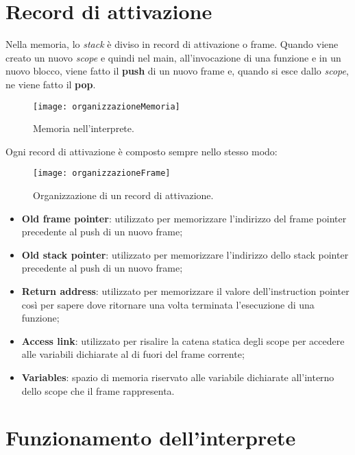 \documentclass[../report.tex]{subfiles}
\begin{document}
\section{Record di attivazione}\label{s:record-di-attivazione}
Nella memoria, lo \textit{stack} \`e diviso in record di attivazione o frame. Quando viene creato un nuovo \textit{scope} e quindi nel main, all'invocazione di una funzione e in un nuovo blocco, viene fatto il \textbf{push} di un nuovo frame e, quando si esce dallo \textit{scope}, ne viene fatto il \textbf{pop}.
\begin{figure}[H]
    \centering
    \texttt{[image: organizzazioneMemoria]}
    \caption{Memoria nell'interprete.}
\end{figure}
Ogni record di attivazione \`e composto sempre nello stesso modo:
\begin{figure}[H]
    \centering
    \texttt{[image: organizzazioneFrame]}
    \caption{Organizzazione di un record di attivazione.}
\end{figure}
\begin{itemize}
    \item \textbf{Old frame pointer}: utilizzato per memorizzare l'indirizzo del frame pointer precedente al push di un nuovo frame;
    \item \textbf{Old stack pointer}: utilizzato per memorizzare l'indirizzo dello stack pointer precedente al push di un nuovo frame;
    \item \textbf{Return address}: utilizzato per memorizzare il valore dell'instruction pointer cos\`i per sapere dove ritornare una volta terminata l'esecuzione di una funzione;
    \item \textbf{Access link}: utilizzato per risalire la catena statica degli scope per accedere alle variabili dichiarate al di fuori del frame corrente;
    \item \textbf{Variables}: spazio di memoria riservato alle variabile dichiarate all'interno dello scope che il frame rappresenta.
\end{itemize}

\section{Funzionamento dell'interprete}\label{s:funzionamento-interprete}
\end{document}
